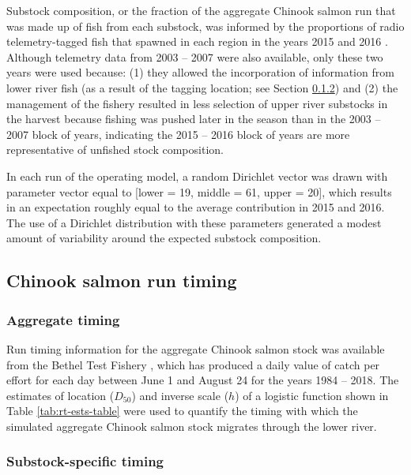 \documentclass[12pt,]{book}
\theoremstyle{definition}
\theoremstyle{definition}
\theoremstyle{definition}
\theoremstyle{remark}
\begin{document}
\noindent
Substock composition, or the fraction of the aggregate Chinook salmon
run that was made up of fish from each substock, was informed by the
proportions of radio telemetry-tagged fish that spawned in each region
in the years 2015 and 2016
\citep{smith-liller-2017a, smith-liller-2017b}. Although telemetry data
from 2003 -- 2007 were also available, only these two years were used
because: (1) they allowed the incorporation of information from lower
river fish (as a result of the tagging location; see Section
\ref{mse-data-ss-timing}) and (2) the management of the fishery resulted
in less selection of upper river substocks in the harvest because
fishing was pushed later in the season than in the 2003 -- 2007 block of
years, indicating the 2015 -- 2016 block of years are more
representative of unfished stock composition.

In each run of the operating model, a random Dirichlet vector was drawn
with parameter vector equal to {[}lower = 19, middle = 61, upper =
20{]}, which results in an expectation roughly equal to the average
contribution in 2015 and 2016. The use of a Dirichlet distribution with
these parameters generated a modest amount of variability around the
expected substock composition.

\subsection{Chinook salmon run timing}\label{chinook-salmon-run-timing}

\subsubsection{Aggregate timing}\label{aggregate-timing}

\noindent
Run timing information for the aggregate Chinook salmon stock was
available from the Bethel Test Fishery \citep{bue-lipka-2016}, which has
produced a daily value of catch per effort for each day between June 1
and August 24 for the years 1984 -- 2018. The estimates of location
(\(D_{50}\)) and inverse scale (\(h\)) of a logistic function shown in
Table \ref{tab:rt-ests-table} were used to quantify the timing with
which the simulated aggregate Chinook salmon stock migrates through the
lower river.

\subsubsection{Substock-specific timing}\label{mse-data-ss-timing}
\end{document}
